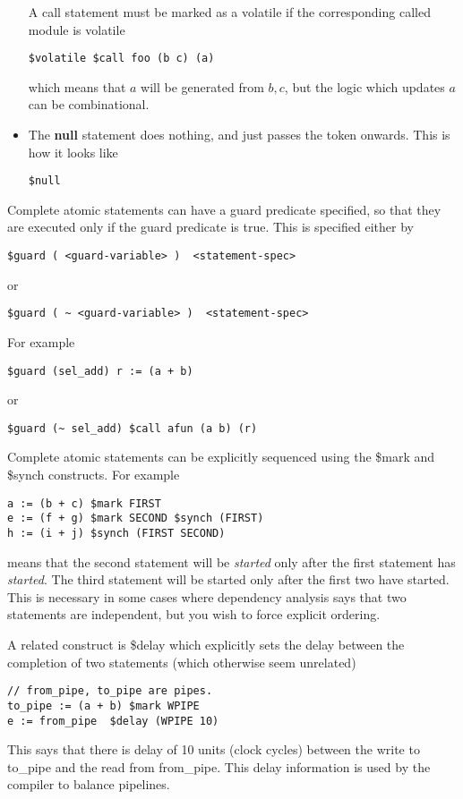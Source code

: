 \documentclass{article}
\begin{document}
\begin{itemize}
A call statement must be marked as a volatile
if the corresponding called module is volatile
\begin{verbatim}
$volatile $call foo (b c) (a)
\end{verbatim}
which means that $a$ will be generated from $b,c$, but
the logic which updates $a$ can be combinational.

\item The {\bf null} statement does nothing, and just passes the
token onwards.  This is how it looks like
\begin{verbatim}
$null
\end{verbatim}
\end{itemize}

Complete atomic statements can have a guard predicate
specified, so that they are executed only if the guard
predicate is true.  This is specified either by
\begin{verbatim}
$guard ( <guard-variable> )  <statement-spec>
\end{verbatim}
or 
\begin{verbatim}
$guard ( ~ <guard-variable> )  <statement-spec>
\end{verbatim}
For example
\begin{verbatim}
$guard (sel_add) r := (a + b)
\end{verbatim}
or
\begin{verbatim}
$guard (~ sel_add) $call afun (a b) (r)
\end{verbatim}

Complete atomic statements can be explicitly sequenced using
the \$mark and \$synch constructs.  For example
\begin{verbatim}
a := (b + c) $mark FIRST
e := (f + g) $mark SECOND $synch (FIRST)
h := (i + j) $synch (FIRST SECOND)
\end{verbatim}
means that the second statement will be {\em started}
only after the first statement has {\em started}.  The
third statement will be started only after the first
two have started. This
is necessary in some cases where dependency analysis
says that two statements are independent, but you wish
to force explicit ordering.

A related construct is \$delay which explicitly sets
the delay between the completion of two statements
(which otherwise seem unrelated)
\begin{verbatim}
// from_pipe, to_pipe are pipes.
to_pipe := (a + b) $mark WPIPE
e := from_pipe  $delay (WPIPE 10)
\end{verbatim}
This says that there is delay of 10 units (clock cycles)
between the write to to\_pipe and the read from from\_pipe.
This delay information is used by the compiler to 
balance pipelines.
\end{document}
